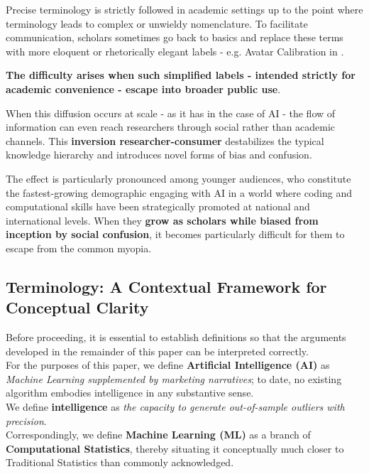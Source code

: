 \documentclass{article}
\begin{document}
Precise terminology is strictly followed in academic settings up to the point where terminology leads to complex or unwieldy nomenclature. To facilitate communication, scholars sometimes go back to basics and replace these terms with more eloquent or rhetorically elegant labels - e.g. Avatar Calibration in \cite{PhD}.

\textbf{The difficulty arises when such simplified labels - intended strictly for academic convenience - escape into broader public use}.

When this diffusion occurs at scale - as it has in the case of AI - the flow of information can even reach researchers through social rather than academic channels. This \textbf{inversion researcher-consumer} destabilizes the typical knowledge hierarchy and introduces novel forms of bias and confusion. 

The effect is particularly pronounced among younger audiences, who constitute the fastest-growing demographic engaging with AI in a world where coding and computational skills have been strategically promoted at national and international levels. When they \textbf{grow as scholars while biased from inception by social confusion}, it becomes particularly difficult for them to escape from the common myopia.\\


\subsection{Terminology: A Contextual Framework for Conceptual Clarity}
\label{subsection: Terminology: A Contextual Framework for Conceptual Clarity}
Before proceeding, it is essential to establish definitions so that the arguments developed in the remainder of this paper can be interpreted correctly.\\

For the purposes of this paper, we define \textbf{Artificial Intelligence (AI)} as \textit{Machine Learning supplemented by marketing narratives}; to date, no existing algorithm embodies intelligence in any substantive sense.\\

We define \textbf{intelligence} as \textit{the capacity to generate out-of-sample outliers with precision}.\\

Correspondingly, we define \textbf{Machine Learning (ML)} as a branch of \textbf{Computational Statistics}, thereby situating it conceptually much closer to Traditional Statistics than commonly acknowledged.\\
\end{document}
